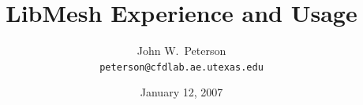 \documentclass[
  compress
  ,12pt
]{beamer}
\title{LibMesh Experience and Usage}
\author{John W.\ Peterson \\ \texttt{\tiny peterson@cfdlab.ae.utexas.edu}}
\institute[UT-Austin]{Univ.\ of Texas at Austin}
\date{January 12, 2007}
\begin{document}
  
\begin{frame}
  \titlepage
\end{frame}









    
    

\end{document}
